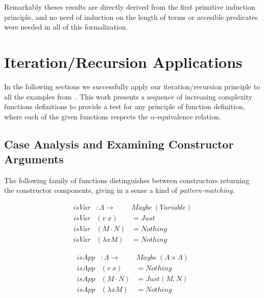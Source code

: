 \documentclass{entcs}
\newcommand{\alp}{\ensuremath{\alpha}}
\begin{document}
 \hspace{5px}

Remarkably theses results are directly derived from the first primitive induction principle, and no need of induction on the length of terms or accesible predicates were needed in all of this formalization.

\appendix

\section{Iteration/Recursion Applications}
\label{sec:applications}

In the following sections we successfully apply our iteration/recursion principle to all the examples from~\cite{Norrish04recursivefunction}. This work presents a sequence of increasing complexity functions definitions to provide a test for any principle of function definition, where each of the given functions respects the \alp-equivalence relation.

\subsection{Case Analysis and Examining Constructor Arguments}
\label{sec:caseanalysis}

The following family of functions distinguishes between constructors returning the constructor components, giving in a sense a kind of \emph{pattern-matching}.

\begin{minipage}{.5\textwidth}
\[\begin{array}{rll}
isVar &: \Lambda \rightarrow& Maybe\ ( Variable ) \\
isVar &(v\ x)         &= Just \\
isVar &(M \cdot N)   &= Nothing \\
isVar &(\lambda x M) &= Nothing
\end{array}\]
\end{minipage}
\begin{minipage}{.5\textwidth}
\[\begin{array}{rll}
isApp &: \Lambda \rightarrow& Maybe\ (\Lambda \times \Lambda) \\
isApp &(v\ x)          &= Nothing \\
isApp &(M \cdot N)   &= Just (M , N) \\
isApp &(\lambda x M) &= Nothing
\end{array}\]
\end{minipage}
\end{document}
